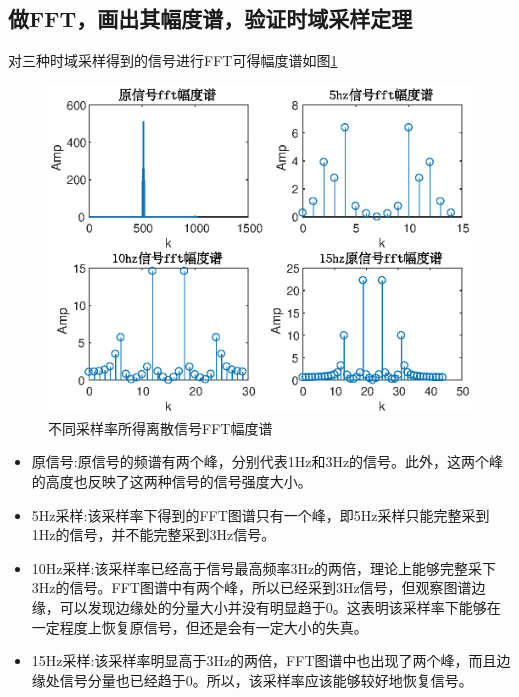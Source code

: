 \documentclass[UTF8]{article}
\begin{document}
\begin{CJK}{UTF8}{gkai}
\subsection{做FFT，画出其幅度谱，验证时域采样定理}
对三种时域采样得到的信号进行FFT可得幅度谱如图\ref{pro2_fig2}
\begin{figure}
  \includegraphics[scale=0.4]{pro2_subpro2.eps}
  \caption{不同采样率所得离散信号FFT幅度谱}
  \label{pro2_fig2}
\end{figure}
\begin{itemize}
  \item 原信号:原信号的频谱有两个峰，分别代表1Hz和3Hz的信号。此外，这两个峰的高度也反映了这两种信号的信号强度大小。
  \item 5Hz采样:该采样率下得到的FFT图谱只有一个峰，即5Hz采样只能完整采到1Hz的信号，并不能完整采到3Hz信号。
  \item 10Hz采样:该采样率已经高于信号最高频率3Hz的两倍，理论上能够完整采下3Hz的信号。FFT图谱中有两个峰，所以已经采到3Hz信号，但观察图谱边缘，可以发现边缘处的分量大小并没有明显趋于0。这表明该采样率下能够在一定程度上恢复原信号，但还是会有一定大小的失真。
  \item 15Hz采样:该采样率明显高于3Hz的两倍，FFT图谱中也出现了两个峰，而且边缘处信号分量也已经趋于0。所以，该采样率应该能够较好地恢复信号。
\end{itemize}


\end{CJK}
\end{document}
